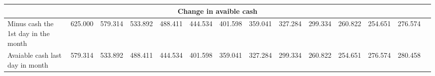 \begin{tabularx}{\textwidth}{|X|c|c|c|c|c|c|c|c|c|c|c|c|X|}
\multicolumn{14}{|c|}{\cellcolor[HTML]{9B9B9B}Change in avaible cash}                                                                                                                      \\ \hline
Minus cash the 1st day in the month          & 625.000 & 579.314  & 533.892 & 488.411 & 444.534 & 401.598 & 359.041 & 327.284 & 299.334   & 260.822 & 254.651  & 276.574  &                \\ \hline
\rowcolor[HTML]{9B9B9B} 
Avaiable cash last day in month              & 579.314 & 533.892  & 488.411 & 444.534 & 401.598 & 359.041 & 327.284 & 299.334 & 260.822   & 254.651 & 276.574  & 280.458  &                \\ \hline
\end{tabularx}